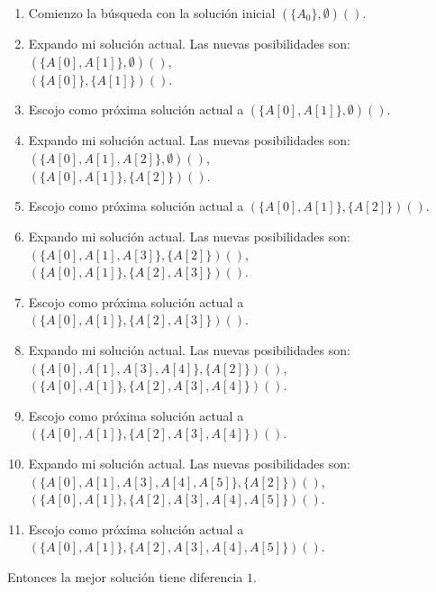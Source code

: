 \documentclass{article}
\begin{document}
\begin{enumerate}
\begin{enumerate}
\item Comienzo la búsqueda con la solución inicial $(\{A_0\},\emptyset) ()$.

\item Expando mi solución actual. Las nuevas posibilidades son: \\
$(\{A[0],A[1]\},\emptyset) ()$,\\
$(\{A[0]\},\{A[1]\}) ()$.

\item Escojo como próxima solución actual a $(\{A[0],A[1]\},\emptyset) ()$.

\item Expando mi solución actual. Las nuevas posibilidades son: \\
$(\{A[0],A[1],A[2]\},\emptyset) ()$,\\
$(\{A[0],A[1]\},\{A[2]\}) ()$.

\item Escojo como próxima solución actual a $(\{A[0],A[1]\},\{A[2]\}) ()$.

\item Expando mi solución actual. Las nuevas posibilidades son: \\
$(\{A[0],A[1],A[3]\},\{A[2]\}) ()$,\\
$(\{A[0],A[1]\},\{A[2],A[3]\}) ()$.

\item Escojo como próxima solución actual a $(\{A[0],A[1]\},\{A[2],A[3]\}) ()$.

\item Expando mi solución actual. Las nuevas posibilidades son: \\
$(\{A[0],A[1],A[3],A[4]\},\{A[2]\}) ()$,\\
$(\{A[0],A[1]\},\{A[2],A[3],A[4]\}) ()$.

\item Escojo como próxima solución actual a\\
$(\{A[0],A[1]\},\{A[2],A[3],A[4]\}) ()$.

\item Expando mi solución actual. Las nuevas posibilidades son: \\
$(\{A[0],A[1],A[3],A[4],A[5]\},\{A[2]\}) ()$,\\
$(\{A[0],A[1]\},\{A[2],A[3],A[4],A[5]\}) ()$.

\item Escojo como próxima solución actual a \\
$(\{A[0],A[1]\},\{A[2],A[3],A[4],A[5]\}) ()$.

\end{enumerate}

Entonces la mejor solución tiene diferencia $1$.

\end{enumerate}
\end{document}
